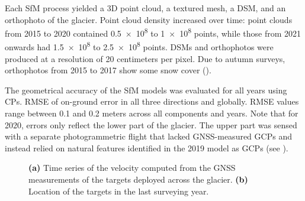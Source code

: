 Each SfM process yielded a 3D point cloud, a textured mesh, a DSM, and an orthophoto of the glacier. 
Point cloud density increased over time: point clouds from 2015 to 2020 contained \SI{0.5e8}{} to \SI{1e8}{} 
points, while those from 2021 onwards had \SI{1.5e8}{} to \SI{2.5e8}{} points. 
DSMs and orthophotos were produced at a resolution of 20 centimeters per pixel.
Due to autumn surveys, orthophotos from 2015 to 2017 show some snow cover ().

The geometrical accuracy of the SfM models was evaluated for all years using CPs.
 RMSE of on-ground error in all three directions and globally. 
RMSE values range between 0.1 and 0.2 meters across all components and years. 
Note that for 2020, errors only reflect the lower part of the glacier. 
The upper part was sensed with a separate photogrammetric flight that lacked GNSS-measured
GCPs and instead relied on natural features identified in the 2019 model as GCPs (see ).


\begin{figure}[ht!]
    \caption{\textbf{(a)} Time series of the velocity computed from the GNSS measurements of the targets deployed across the glacier. 
    \textbf{(b)} Location of the targets in the last surveying year.}
    \label{fig:3:GNSS_velocity}		
\end{figure}

